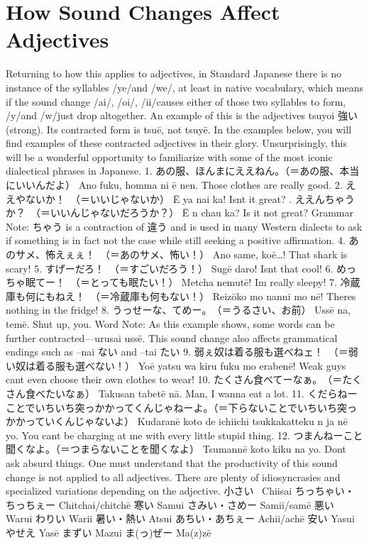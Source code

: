 \section{How Sound Changes Affect Adjectives}
 Returning to how this applies to adjectives, in Standard Japanese there is no instance of the syllables \slash ye\slash  and \slash we\slash , at least in native vocabulary, which means if the sound change \slash ai\slash , \slash oi\slash , \slash ii\slash  \textrightarrow  [ē] causes either of those two syllables to form, \slash y\slash  and \slash w\slash  just drop altogether. An example of this is the adjectives tsuyoi 強い (strong). Its contracted form is tsuē, not tsuyē. In the examples below, you will find examples of these contracted adjectives in their glory. Unsurprisingly, this will be a wonderful opportunity to familiarize with some of the most iconic dialectical phrases in Japanese. 1. あの服、ほんまにええねん。（＝あの服、本当にいいんだよ） Ano fuku, homma ni ē nen. Those clothes are really good. 2. ええやないか！　（＝いいじゃないか） Ē ya nai ka! Isn\textquotesingle t it great? \hfill{}. ええんちゃうか？　（＝いいんじゃないだろうか？） Ē n chau ka? Is it not great? Grammar Note: ちゃう is a contraction of 違う and is used in many Western dialects to ask if something is in fact not the case while still seeking a positive affirmation. 4. あのサメ、怖えぇぇ！　（＝あのサメ、怖い！） Ano same, koē…! That shark is scary! 5. すげーだろ！　（＝すごいだろう！） Sugē daro! Isn\textquotesingle t that cool! 6. めっちゃ眠てー！　（＝とっても眠たい！） Metcha nemutē! I\textquotesingle m really sleepy! 7. 冷蔵庫も何にもねえ！　（＝冷蔵庫も何もない！） Reizōko mo nan\textquotesingle ni mo nē! There\textquotesingle s nothing in the fridge! 8. うっせーな、てめー。　（＝うるさい、お前） Ussē na, temē. Shut up, you. \hfill\break
Word Note: As this example shows, some words can be further contracted—urusai \textrightarrow  ussē. This sound change also affects grammatical endings such as –nai ない and –tai たい 9. 弱ぇ奴は着る服も選べねェ！　（＝弱い奴は着る服も選べない！） Yoē yatsu wa kiru fuku mo erabenē! Weak guys can\textquotesingle t even choose their own clothes to wear! 10. たくさん食べてーなぁ。　（＝たくさん食べたいなぁ） Takusan tabetē nā. Man, I wanna eat a lot. 11. くだらねーことでいちいち突っかかってくんじゃねーよ。（＝下らないことでいちいち突っかかっていくんじゃないよ） Kudaranē koto de ichi\textquotesingle ichi tsukkakatteku n ja nē yo. You can\textquotesingle t be charging at me with every little stupid thing. 12. つまんねーこと聞くなよ。（＝つまらないことを聞くなよ） Tsuman\textquotesingle nē koto kiku na yo. Don\textquotesingle t ask absurd things. One must understand that the productivity of this sound change is not applied to all adjectives. There are plenty of idiosyncrasies and specialized variations depending on the adjective. 小さい  Chiisai  ちっちゃい・ちっちぇー Chitchai\slash chitchē  寒い Samui  さみい・さめー Samii\slash samē 悪い Warui  わりい Warii  暑い・熱い Atsui  あちい・あちぇー Achii\slash achē 安い Yasui  やせえ Yasē  まずい Mazui  ま(っ)ぜー Ma(z)zē \hfill\break
